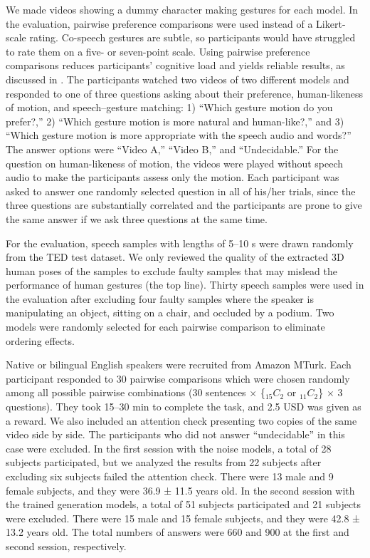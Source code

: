 \documentclass[acmtog]{acmart}
\begin{document}
We made videos showing a dummy character making gestures for each model. In the evaluation, pairwise preference comparisons were used instead of a Likert-scale rating. Co-speech gestures are subtle, so participants would have struggled to rate them on a five- or seven-point scale. Using pairwise preference comparisons reduces participants' cognitive load and yields reliable results, as discussed in \cite{clark2018rate}. The participants watched two videos of two different models and responded to one of three questions asking about their preference, human-likeness of motion, and speech--gesture matching: 1) ``Which gesture motion do you prefer?,'' 2) ``Which gesture motion is more natural and human-like?,'' and 3) ``Which gesture motion is more appropriate with the speech audio and words?'' The answer options were ``Video A,'' ``Video B,'' and ``Undecidable.'' For the question on human-likeness of motion, the videos were played without speech audio to make the participants assess only the motion. Each participant was asked to answer one randomly selected question in all of his/her trials, since the three questions are substantially correlated and the participants are prone to give the same answer if we ask three questions at the same time.

For the evaluation, speech samples with lengths of 5--10 s were drawn randomly from the TED test dataset. We only reviewed the quality of the extracted 3D human poses of the samples to exclude faulty samples that may mislead the performance of human gestures (the top line). Thirty speech samples were used in the evaluation after excluding four faulty samples where the speaker is manipulating an object, sitting on a chair, and occluded by a podium. Two models were randomly selected for each pairwise comparison to eliminate ordering effects.

Native or bilingual English speakers were recruited from Amazon MTurk. Each participant responded to 30 pairwise comparisons which were chosen randomly among all possible pairwise combinations (30 sentences $\times$ \{${}_{15}C_2$ or ${}_{11}C_2$\} $\times$ 3 questions). They took 15--30 min to complete the task, and 2.5 USD was given as a reward. We also included an attention check presenting two copies of the same video side by side. The participants who did not answer ``undecidable'' in this case were excluded. In the first session with the noise models, a total of 28 subjects participated, but we analyzed the results from 22 subjects after excluding six subjects failed the attention check. There were 13 male and 9 female subjects, and they were 36.9 ± 11.5 years old. In the second session with the trained generation models, a total of 51 subjects participated and 21 subjects were excluded. There were 15 male and 15 female subjects, and they were 42.8 ± 13.2 years old. The total numbers of answers were 660 and 900 at the first and second session, respectively.
\end{document}
